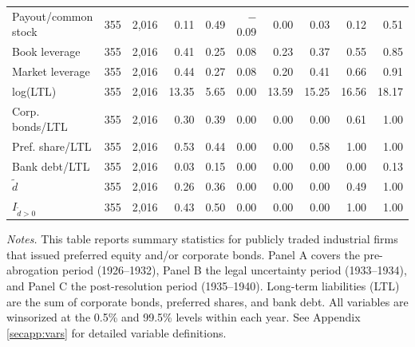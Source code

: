 \begin{table}[p]
\begin{threeparttable}
\begin{tabular}{lrrrrrrrrr}
            Payout/common stock & 355 & 2,016 & 0.11 & 0.49 & $-$0.09 & 0.00 & 0.03 & 0.12 & 0.51 \\
            Book leverage & 355 & 2,016 & 0.41 & 0.25 & 0.08 & 0.23 & 0.37 & 0.55 & 0.85 \\
            Market leverage & 355 & 2,016 & 0.44 & 0.27 & 0.08 & 0.20 & 0.41 & 0.66 & 0.91 \\
            log(LTL) & 355 & 2,016 & 13.35 & 5.65 & 0.00 & 13.59 & 15.25 & 16.56 & 18.17 \\
            Corp. bonds/LTL & 355 & 2,016 & 0.30 & 0.39 & 0.00 & 0.00 & 0.00 & 0.61 & 1.00 \\
            Pref. share/LTL & 355 & 2,016 & 0.53 & 0.44 & 0.00 & 0.00 & 0.58 & 1.00 & 1.00 \\
            Bank debt/LTL & 355 & 2,016 & 0.03 & 0.15 & 0.00 & 0.00 & 0.00 & 0.00 & 0.13 \\
            \ensuremath{\tilde{d}} & 355 & 2,016 & 0.26 & 0.36 & 0.00 & 0.00 & 0.00 & 0.49 & 1.00 \\
            \ensuremath{I_{\tilde{d}>0}} & 355 & 2,016 & 0.43 & 0.50 & 0.00 & 0.00 & 0.00 & 1.00 & 1.00 \\
            \bottomrule
        \end{tabular}
    \end{threeparttable}

    \vspace*{3mm} \justifying \noindent
\scriptsize{\textit{Notes.} This table reports summary statistics for publicly traded industrial firms that issued preferred equity and/or corporate bonds. Panel A covers the pre-abrogation period (1926--1932), Panel B the legal uncertainty period (1933--1934), and Panel C the post-resolution period (1935--1940). Long-term liabilities (LTL) are the sum of corporate bonds, preferred shares, and bank debt. All variables are winsorized at the 0.5\% and 99.5\% levels within each year. See Appendix \ref{secapp:vars} for detailed variable definitions.}
\end{table}